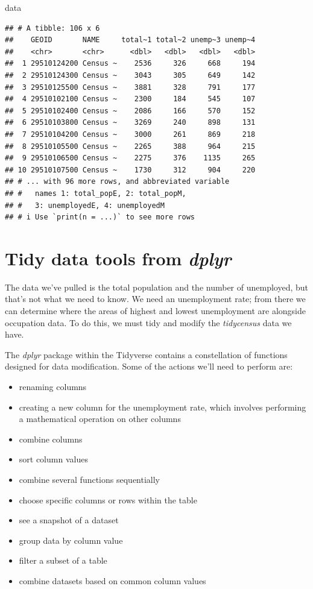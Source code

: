 \documentclass[
  krantz2]{krantz}
\makeatletter
\newenvironment{Shaded}{\begin{snugshade}}{\end{snugshade}}
\newcommand{\NormalTok}[1]{#1}
\providecommand{\tightlist}{%
  \setlength{\itemsep}{0pt}\setlength{\parskip}{0pt}}
\newenvironment{kframe}{%
\medskip{}
\setlength{\fboxsep}{.8em}
 \def\at@end@of@kframe{}%
 \ifinner\ifhmode%
  \def\at@end@of@kframe{\end{minipage}}%
  \begin{minipage}{\columnwidth}%
 \fi\fi%
 \def\FrameCommand##1{\hskip\@totalleftmargin \hskip-\fboxsep
 \colorbox{shadecolor}{##1}\hskip-\fboxsep
     \hskip-\linewidth \hskip-\@totalleftmargin \hskip\columnwidth}%
 \MakeFramed {\advance\hsize-\width
   \@totalleftmargin\z@ \linewidth\hsize
   \@setminipage}}%
 {\par\unskip\endMakeFramed%
 \at@end@of@kframe}
\renewenvironment{Shaded}{\begin{kframe}}{\end{kframe}}
\makeatother
\begin{document}
\begin{Shaded}
\begin{Highlighting}[]
\NormalTok{data}
\end{Highlighting}
\end{Shaded}

\begin{verbatim}
## # A tibble: 106 x 6
##    GEOID       NAME     total~1 total~2 unemp~3 unemp~4
##    <chr>       <chr>      <dbl>   <dbl>   <dbl>   <dbl>
##  1 29510124200 Census ~    2536     326     668     194
##  2 29510124300 Census ~    3043     305     649     142
##  3 29510125500 Census ~    3881     328     791     177
##  4 29510102100 Census ~    2300     184     545     107
##  5 29510102400 Census ~    2086     166     570     152
##  6 29510103800 Census ~    3269     240     898     131
##  7 29510104200 Census ~    3000     261     869     218
##  8 29510105500 Census ~    2265     388     964     215
##  9 29510106500 Census ~    2275     376    1135     265
## 10 29510107500 Census ~    1730     312     904     220
## # ... with 96 more rows, and abbreviated variable
## #   names 1: total_popE, 2: total_popM,
## #   3: unemployedE, 4: unemployedM
## # i Use `print(n = ...)` to see more rows
\end{verbatim}

\hypertarget{dplyr-tidy-tools}{%
\section{\texorpdfstring{Tidy data tools from \emph{dplyr}}{Tidy data tools from dplyr}}\label{dplyr-tidy-tools}}

The data we've pulled is the total population and the number of unemployed, but that's not what we need to know. We need an unemployment rate; from there we can determine where the areas of highest and lowest unemployment are alongside occupation data. To do this, we must tidy and modify the \emph{tidycensus} data we have.

The \emph{dplyr} package within the Tidyverse contains a constellation of functions designed for data modification. Some of the actions we'll need to perform are:

\begin{itemize}
\tightlist
\item
  renaming columns
\item
  creating a new column for the unemployment rate, which involves performing a mathematical operation on other columns
\item
  combine columns
\item
  sort column values
\item
  combine several functions sequentially
\item
  choose specific columns or rows within the table
\item
  see a snapshot of a dataset
\item
  group data by column value
\item
  filter a subset of a table
\item
  combine datasets based on common column values
\end{itemize}
\end{document}
